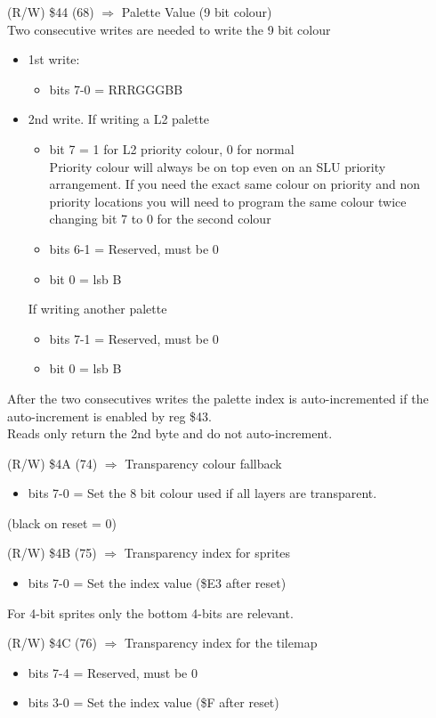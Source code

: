(R/W) \$44 (68) $\Rightarrow$ Palette Value (9 bit colour)\\
Two consecutive writes are needed to write the 9 bit colour
\begin{itemize}
\item[] 1st write:
  \begin{itemize}
  \item[] bits 7-0 = RRRGGGBB
  \end{itemize}
\item[] 2nd write.
  If writing a L2 palette\\
  \begin{itemize}
  \item[] bit 7 = 1 for L2 priority colour, 0 for normal\\
    Priority colour will always be on top even on an SLU priority
    arrangement. If you need the exact same colour on priority and non
    priority locations you will need to program the same colour twice
    changing bit 7 to 0 for the second colour
  \item[] bits 6-1 = Reserved, must be 0
  \item[] bit 0 = lsb B
  \end{itemize}
  If writing another palette
  \begin{itemize}
  \item[] bits 7-1 = Reserved, must be 0
  \item[] bit 0 = lsb B
  \end{itemize}
\end{itemize}
After the two consecutives writes the palette index is
auto-incremented if the auto-increment is enabled by reg \$43.\\
Reads only return the 2nd byte and do not auto-increment.

(R/W) \$4A (74) $\Rightarrow$ Transparency colour fallback
\begin{itemize}
\item[] bits 7-0 = Set the 8 bit colour used if all layers are transparent.
\end{itemize}
(black on reset = 0)

(R/W) \$4B (75) $\Rightarrow$ Transparency index for sprites
\begin{itemize}
\item[] bits 7-0 = Set the index value (\$E3 after reset)
\end{itemize}
For 4-bit sprites only the bottom 4-bits are relevant.

(R/W) \$4C (76) $\Rightarrow$ Transparency index for the tilemap
\begin{itemize}
\item[] bits 7-4 = Reserved, must be 0
\item[] bits 3-0 = Set the index value (\$F after reset)
\end{itemize}

